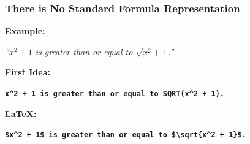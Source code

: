 \documentclass[usenames,dvipsnames,handout]{beamer}
\def\str#1{\emph{``#1''}}   %
\def\strcol#1{\textcolor{NavyBlue}{#1}}
\begin{document}


\begin{frame}[fragile]
    \frametitle{There is No Standard Formula Representation}
% 


    \textbf{Example:}

    \vspace{0.5em}
    \str{\strcol{$x^2 + 1$} is greater than or equal to \strcol{$\sqrt{x^2 + 1}$}.}

    \pause
    \vspace{2em}
    \textbf{First Idea:}

    \vspace{0.5em}
    {\footnotesize \textbf{\texttt{\strcol{x{\textasciicircum}2 + 1} is greater than or equal to \strcol{SQRT(x{\textasciicircum}2 + 1)}.}}}

    \pause
    \vspace{2em}
    \textbf{LaTeX:}

    \vspace{0.5em}
    {\footnotesize \textbf{\texttt{\strcol{\$x{\textasciicircum}2 + 1\$} is greater than or equal to \strcol{\${\textbackslash}sqrt\{x{\textasciicircum}2 + 1\}\$}.}}}
\end{frame}
\end{document}
